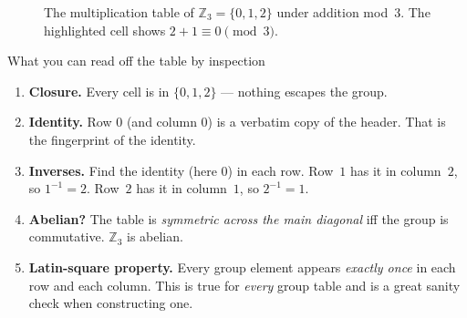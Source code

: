 \documentclass[11pt]{article}
\begin{document}
\begin{figure}[H]
\centering
{}
\caption{The multiplication table of $\mathbb{Z}_3 = \{0,1,2\}$ under
addition mod~$3$. The highlighted cell shows $2 + 1 \equiv 0 \pmod{3}$.}
\end{figure}

\begin{keybox}{What you can read off the table by inspection}
\begin{enumerate}[label=(\alph*), leftmargin=2em, itemsep=2pt]
  \item \textbf{Closure.} Every cell is in $\{0,1,2\}$ --- nothing escapes
    the group.
  \item \textbf{Identity.} Row $0$ (and column $0$) is a verbatim copy of
    the header. That is the fingerprint of the identity.
  \item \textbf{Inverses.} Find the identity (here $0$) in each row.
    Row~$1$ has it in column~$2$, so $1^{-1} = 2$. Row~$2$ has it in
    column~$1$, so $2^{-1} = 1$.
  \item \textbf{Abelian?} The table is \emph{symmetric across the main
    diagonal} iff the group is commutative. $\mathbb{Z}_3$ is abelian.
  \item \textbf{Latin-square property.} Every group element appears
    \emph{exactly once} in each row and each column. This is true for
    \emph{every} group table and is a great sanity check when constructing
    one.
\end{enumerate}
\end{keybox}
\end{document}
